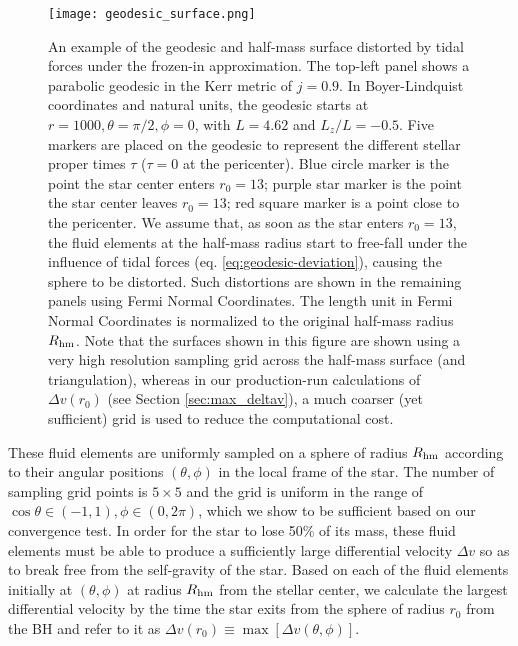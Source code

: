 \documentclass[useAMS,usenatbib]{mn2e}
\def\Rhm{R_{\rm hm}}
\newcommand{\lrsb}[1]{\left[{#1}\right]}
\begin{document}
\begin{figure}
    \centering
    \texttt{[image: geodesic\_surface.png]}
    \caption{
    An example of the geodesic and half-mass surface distorted by tidal forces under the frozen-in approximation.
    The top-left panel shows a parabolic geodesic in the Kerr metric of $j=0.9$. In Boyer-Lindquist coordinates and natural units, the geodesic starts at $r=1000,\theta=\pi/2,\phi=0$, with $L=4.62$ and $L_z/L=-0.5$.
    Five markers are placed on the geodesic to represent the different stellar proper times $\tau$ ($\tau=0$ at the pericenter).
    Blue circle marker is the point the star center enters $r_0=13$; purple star marker is the point the star center leaves $r_0=13$; red square marker is a point close to the pericenter.
    We assume that, as soon as the star enters $r_0=13$, the fluid elements at the half-mass radius start to free-fall under the influence of tidal forces (eq. \ref{eq:geodesic-deviation}), causing the sphere to be distorted.
    Such distortions are shown in the remaining panels using Fermi Normal Coordinates.
    The length unit in Fermi Normal Coordinates is normalized to the original half-mass radius $\Rhm$.
    Note that the surfaces shown in this figure are shown using a very high resolution sampling grid across the half-mass surface (and triangulation), whereas in our production-run
    calculations of $\Delta v(r_0)$ (see Section \ref{sec:max_deltav}), a much coarser (yet sufficient) grid is used to reduce the computational cost.
    }
    \label{fig:geodesic_surface}
\end{figure}

These fluid elements are uniformly sampled on a sphere of radius $\Rhm$ according to their angular positions $(\theta, \phi)$ in the local frame of the star. The number of sampling grid points is $5\times5$ and the grid is uniform in the range of $\cos\theta\in(-1, 1),\phi\in(0,2\pi)$, which we show to be sufficient based on our convergence test. In order for the star to lose 50\% of its mass, these fluid elements must be able to produce a sufficiently large differential velocity $\Delta v$ so as to break free from the self-gravity of the star. Based on each of the fluid elements initially at $(\theta, \phi)$ at radius $\Rhm$ from the stellar center, we calculate the largest differential velocity by the time the star exits from the sphere of radius $r_0$ from the BH and refer to it as $\Delta v(r_0) \equiv \max \lrsb{\Delta v(\theta, \phi)}$.
\end{document}
